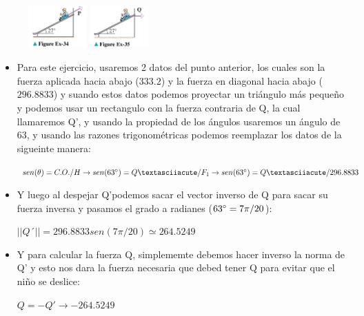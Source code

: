 \documentclass[11pt,letterpaper]{article}
\begin{document}
\begin{figure}[h]
    \centering
    \includegraphics[width=0.2\textwidth]{imagenes/Figure_Ex-34.png}
    \hspace{5cm}
    \includegraphics[width=0.2\textwidth]{imagenes/Figure_Ex-35.png}
\end{figure}

\begin{itemize}

    \item Para este ejercicio, usaremos 2 datos del punto anterior, los cuales son la fuerza aplicada hacia abajo ($333.2$) y la fuerza en diagonal hacia abajo ($296.8833$) y suando estos datos podemos proyectar un triángulo más pequeño y podemos usar un rectangulo con la fuerza contraria de Q, la cual llamaremos Q', y usando la propiedad de los ángulos usaremos un ángulo de 63\degree, y usando las razones trigonométricas podemos reemplazar los datos de la sigueinte manera:
    \begin{center}
        $sen(\theta) = C.O./H \rightarrow sen(63\degree) = Q´/F_1 \rightarrow sen(63\degree) = Q´/296.8833$
    \end{center}
    \item Y luego al despejar Q'podemos sacar el vector inverso de Q para sacar su fuerza inversa y pasamos el grado a radianes ($63\degree = 7\pi / 20$):
    \begin{center}
        $||Q´|| = 296.8833 sen(7\pi / 20) \simeq 264.5249$
    \end{center}
    \item Y para calcular la fuerza Q, simplememte debemos hacer inverso la norma de Q' y esto nos dara la fuerza necesaria que debed tener Q para evitar que el niño se deslice:
    \begin{center}
        $Q = -Q' \rightarrow -264.5249$
    \end{center}
    
\end{itemize}

\end{document}
